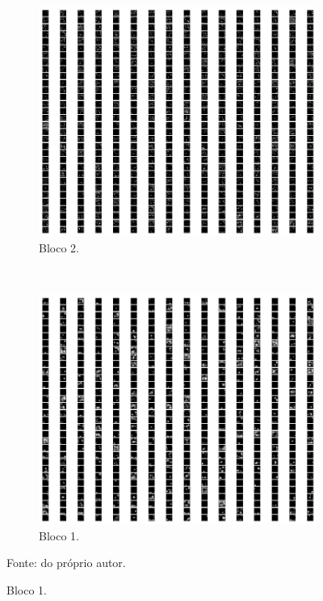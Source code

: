 \begin{figure}[p]
     \begin{subfigure}[t]{0.45\textwidth}
         \centering
         \includegraphics[width=1\linewidth]{recursos/imagens/results/max4.png}
         \caption{Bloco 2.}
         \label{results:fig:datasets:max.4}
     \end{subfigure}%
     ~ 
     \begin{subfigure}[t]{0.45\textwidth}
         \centering
         \includegraphics[width=1\linewidth]{recursos/imagens/results/max5.png}
         \caption{Bloco 1.}
         \label{results:fig:datasets:max.5}
     \end{subfigure}%
 
     Fonte: do próprio autor.
\end{figure}

